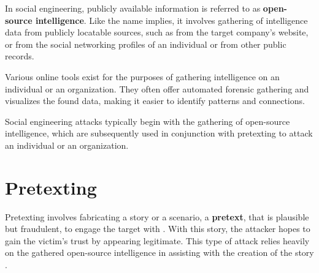 In social engineering, publicly available information is referred to as \textbf{open-source intelligence}. Like the name implies, it involves gathering of intelligence data from publicly locatable sources, such as from the target company's website, or from the social networking profiles of an individual or from other public records.

Various online tools exist for the purposes of gathering intelligence on an individual or an organization. They often offer automated forensic gathering and visualizes the found data, making it easier to identify patterns and connections.

Social engineering attacks typically begin with the gathering of open-source intelligence, which are subsequently used in conjunction with pretexting to attack an individual or an organization.











\section{Pretexting}
\begin{comment}

    - General info about what is pretexting
    - Fabricated scenario that is plausible but fraudulent
    - Originally used by FBI
    - Impersonation
    - Discussion about how modern AI can aid with pretexting is in the final chapter
    - Role in the deception-based SE attacks
    - Common pretexting tactics will be covered later
    - How AI powers up pretexting will be discussed later
        - How AI tech can be utilized to create more sophisticated and convincing pretexts
        - Examples of successful pretexting attacks and their impacts
        - AI and automated pretexting attacks and their effectiveness
        - Analysis of pretexting evolving landscape with AI
    - Ethical considerations?
    - Countermeasures will be covered later also
        - How to identify and mitigate attempts
        - Recommendations for organiations to enhance their defenses against pretexting attacks
        
\end{comment}

Pretexting involves fabricating a story or a scenario, a \textbf{pretext}, that is plausible but fraudulent, to engage the target  with \citep{contehCybersecurityRisksVulnerabilities2016}. With this story, the attacker hopes to gain the victim's trust by appearing legitimate. This type of attack relies heavily on the gathered open-source intelligence in assisting with the creation of the story \citep{hadnagySocialEngineering2018}.

